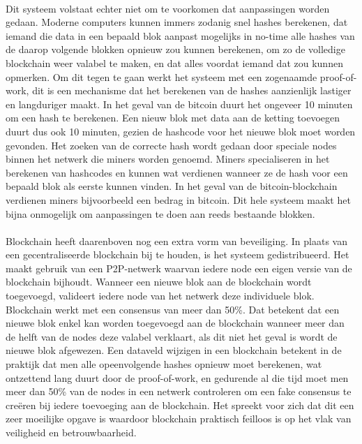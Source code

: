 \paragraph{}
Dit systeem volstaat echter niet om te voorkomen dat aanpassingen worden gedaan. Moderne computers kunnen immers zodanig snel hashes berekenen, dat iemand die data in een bepaald blok aanpast mogelijks in no-time alle hashes van de daarop volgende blokken opnieuw zou kunnen berekenen, om zo de volledige blockchain weer valabel te maken, en dat alles voordat iemand dat zou kunnen opmerken. Om dit tegen te gaan werkt het systeem met een zogenaamde proof-of-work, dit is een mechanisme dat het berekenen van de hashes aanzienlijk lastiger en  langduriger maakt. In het geval van de bitcoin duurt het ongeveer 10 minuten om een hash te berekenen. Een nieuw blok met data aan de ketting toevoegen duurt dus ook 10 minuten, gezien  de hashcode voor het  nieuwe blok moet worden gevonden. Het zoeken van de correcte hash wordt gedaan door speciale nodes binnen het netwerk die miners worden genoemd. Miners specialiseren in het berekenen van hashcodes en kunnen wat verdienen wanneer ze de hash voor een bepaald blok als eerste kunnen vinden. In het geval van de bitcoin-blockchain verdienen miners bijvoorbeeld een bedrag in bitcoin. Dit hele systeem maakt het bijna onmogelijk om aanpassingen te doen aan reeds bestaande blokken. 
\paragraph{}
Blockchain heeft daarenboven nog een extra vorm van beveiliging. In plaats van een gecentraliseerde blockchain bij te houden, is het systeem gedistribueerd. Het maakt gebruik van een P2P-netwerk waarvan iedere node een eigen versie van de blockchain bijhoudt. Wanneer een nieuwe blok aan de blockchain wordt toegevoegd, valideert iedere node van het netwerk deze individuele blok. Blockchain werkt met een consensus van meer dan 50\%. Dat betekent dat een nieuwe blok enkel kan worden toegevoegd aan de blockchain wanneer meer dan de helft van de nodes deze valabel verklaart, als dit niet het geval is wordt de nieuwe blok afgewezen. Een dataveld wijzigen in een blockchain betekent in de praktijk dat men alle opeenvolgende hashes opnieuw moet berekenen, wat ontzettend lang duurt door de proof-of-work, en  gedurende  al die tijd moet men meer dan 50\% van de nodes in een netwerk controleren om een fake consensus te creëren bij iedere toevoeging aan de blockchain. Het spreekt voor zich dat dit een zeer moeilijke opgave is waardoor blockchain praktisch feilloos is op het vlak van veiligheid en betrouwbaarheid.

